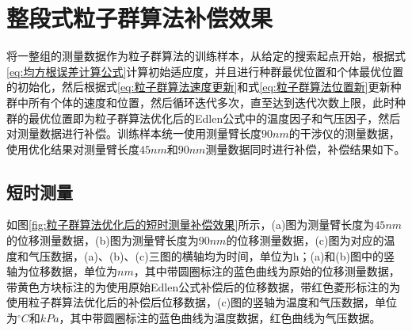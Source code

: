 \section{整段式粒子群算法补偿效果}
将一整组的测量数据作为粒子群算法的训练样本，从给定的搜索起点开始，根据式\eqref{eq:均方根误差计算公式}计算初始适应度，并且进行种群最优位置和个体最优位置的初始化，然后根据式\eqref{eq:粒子群算法速度更新}和式\eqref{eq:粒子群算法位置新}更新种群中所有个体的速度和位置，然后循环迭代多次，直至达到迭代次数上限，此时种群的最优位置即为粒子群算法优化后的Edlen公式中的温度因子和气压因子，然后对测量数据进行补偿。训练样本统一使用测量臂长度$90nm$的干涉仪的测量数据，使用优化结果对测量臂长度$45nm$和$90nm$测量数据同时进行补偿，补偿结果如下。

\subsection{短时测量}
如图\ref{fig:粒子群算法优化后的短时测量补偿效果}所示，(a)图为测量臂长度为$45nm$的位移测量数据，(b)图为测量臂长度为$90nm$的位移测量数据，(c)图为对应的温度和气压数据，(a)、(b)、(c)三图的横轴均为时间，单位为h；(a)和(b)图中的竖轴为位移数据，单位为$nm$，其中带圆圈标注的蓝色曲线为原始的位移测量数据，带黄色方块标注的为使用原始Edlen公式补偿后的位移数据，带红色菱形标注的为使用粒子群算法优化后的补偿后位移数据，(c)图的竖轴为温度和气压数据，单位为$^{\circ}C$和$kPa$，其中带圆圈标注的蓝色曲线为温度数据，红色曲线为气压数据。
